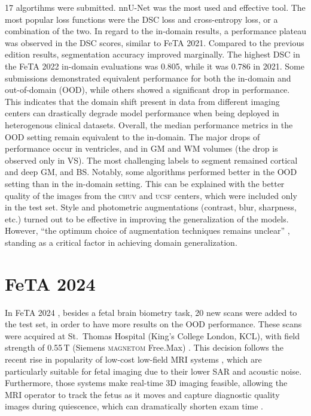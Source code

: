 17 algortihms were submitted. nnU-Net was the most used and effective tool. The most popular loss functions were the DSC loss and cross-entropy loss, or a combination of the two. In regard to the in-domain results, a performance plateau was observed in the DSC scores, similar to FeTA 2021. Compared to the previous edition results, segmentation accuracy improved marginally. The highest DSC in the FeTA 2022 in-domain evaluations was 0.805, while it was 0.786 in 2021. Some submissions demonstrated equivalent performance for both the in-domain and out-of-domain (OOD), while others showed a significant drop in performance. This indicates that the domain shift present in data from different imaging centers can drastically degrade model performance when being deployed in heterogenous clinical datasets. Overall, the median performance metrics in the OOD setting remain equivalent to the in-domain. The major drops of performance occur in ventricles, and in GM and WM volumes (the drop is observed only in VS). The most challenging labels to segment remained cortical and deep GM, and BS. Notably, some algorithms performed better in the OOD setting than in the in-domain setting. This can be explained with the better quality of the images from the \textsc{chuv} and \textsc{ucsf} centers, which were included only in the test set. Style and photometric augmentations (contrast, blur, sharpness, etc.) turned out to be effective in improving the generalization of the models. However, \enquote{the optimum choice of augmentation techniques remains unclear} \cite{FeTA2022_review}, standing as a critical factor in achieving domain generalization.

\section{FeTA 2024}

In FeTA 2024 \cite{FeTA2024}, besides a fetal brain biometry task, 20 new scans were added to the test set, in order to have more results on the OOD performance. These scans were acquired at St.\ Thomas Hospital (King's College London, KCL), with field strength of 0.55\,T (Siemens \textsc{magnetom} Free.Max) \cite{FeTA2024_paper}. This decision follows the recent rise in popularity of low-cost low-field MRI systems \cite{Aviles2023}, which are particularly suitable for fetal imaging due to their lower SAR and acoustic noise. Furthermore, those systems make real-time 3D imaging feasible, allowing the MRI operator to track the fetus as it moves and capture diagnostic quality images during quiescence, which can dramatically shorten exam time \cite{Ponrartana2023}.

